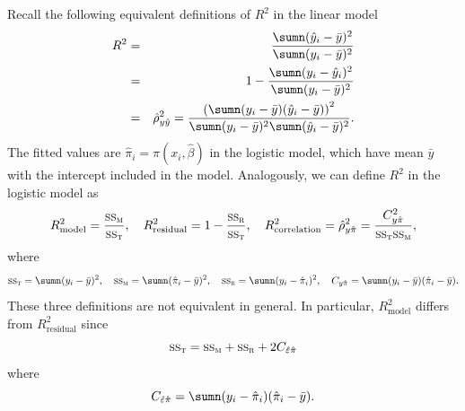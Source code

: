 Recall the following equivalent definitions of $R^2$ in the linear model
\begin{eqnarray*}
R^2 &=& \frac{  \sumn (\hat{y}_i - \bar{y})^2  }{   \sumn (y_i - \bar{y})^2  } \\
&=& 1 - \frac{  \sumn (y_i - \hat{y}_i )^2  }{   \sumn (y_i - \bar{y})^2  } \\
&=& \hat{\rho}^2_{y\hat{y}} = \frac{  \left(  \sumn (y_i - \bar{y}) (\hat{y}_i - \bar{y})  \right)^2 }
{ \sumn (y_i - \bar{y})^2  \sumn (\hat{y}_i - \bar{y})^2  } . 
\end{eqnarray*}
The fitted values are $\hat{\pi}_i = \pi(x_i, \hat{\beta})$ in the logistic model, which have mean $\bar{y}$ with the intercept included in the model. Analogously, we can define $R^2$ in the logistic model as
\begin{eqnarray*}
R^2_{\text{model}} =  \frac{  \textsc{ss}_\textsc{m}  }{   \textsc{ss}_\textsc{t}  } , \quad 
R^2_{\text{residual}} = 1 - \frac{  \textsc{ss}_\textsc{r}   }{   \textsc{ss}_\textsc{t}  } , \quad 
R^2_{\text{correlation}} =  \hat{\rho}^2_{y\hat{\pi}} = \frac{  C_{y\hat{\pi}}^2  }
{  \textsc{ss}_\textsc{t}    \textsc{ss}_\textsc{m} }  , 
\end{eqnarray*}
where
$$
\textsc{ss}_\textsc{t} =  \sumn (y_i - \bar{y})^2,\quad 
\textsc{ss}_\textsc{m} = \sumn (\hat{\pi}_i - \bar{y})^2,\quad
\textsc{ss}_\textsc{r} =   \sumn (y_i - \hat{\pi}_i )^2,\quad
C_{y\hat{\pi}} = \sumn (y_i - \bar{y}) (\hat{\pi}_i  - \bar{y}).
$$
These three definitions are not equivalent in general. In particular, $R^2_{\text{model}} $ differs from $R^2_{\text{residual}} $ since
$$
\textsc{ss}_\textsc{t}  = \textsc{ss}_\textsc{m}  + \textsc{ss}_\textsc{r}  + 2 C_{\hat{\varepsilon} \hat{\pi}}
$$
where 
$$
 C_{\hat{\varepsilon} \hat{\pi}} = \sumn (y_i - \hat{\pi}_i )  (\hat{\pi}_i - \bar{y}). 
$$

